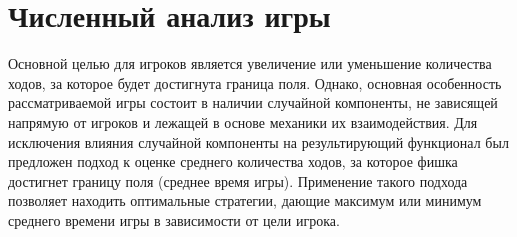 \section{Численный анализ игры}\label{sec:ch3/sec3}

Основной целью для игроков является увеличение или уменьшение количества ходов, за которое будет достигнута граница поля.
Однако, основная особенность рассматриваемой игры состоит в наличии случайной компоненты, не зависящей напрямую от игроков и лежащей в основе механики их взаимодействия.
Для исключения влияния случайной компоненты на результирующий функционал был предложен подход к оценке среднего количества ходов,
за которое фишка достигнет границу поля (среднее время игры).
Применение такого подхода позволяет находить оптимальные стратегии, дающие максимум или минимум среднего времени игры в зависимости от цели игрока.




